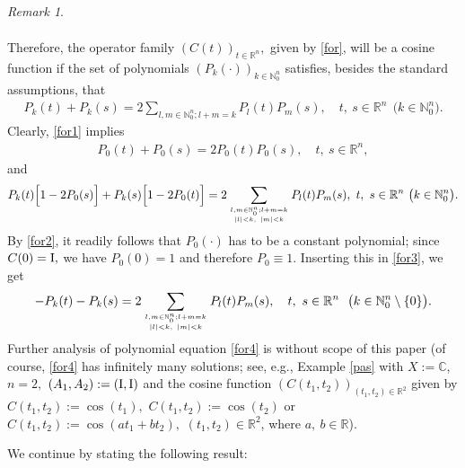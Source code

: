 \documentclass{amsart}
\theoremstyle{definition}
\theoremstyle{remark}
\newtheorem{rem}[thm]{Remark}
\numberwithin{equation}{section}
\begin{document}
\begin{rem}
\begin{itemize}
\begin{align*}
\end{align*}
Therefore, the operator family $(C(t))_{t\in {\mathbb R}^{n}},$ given by \eqref{for}, will be a cosine function if the set of polynomials $(P_{k}(\cdot))_{k\in {\mathbb N}_{0}^{n}}$ satisfies, besides the standard assumptions, that
\begin{align}\label{for1}
P_{k}(t)+P_{k}(s)=2\sum_{l,  m\in {\mathbb N}_{0}^{n}; l+m=k}P_{l}(t) P_{m}(s),\quad t,\ s\in {\mathbb R}^{n}\ \ \bigl(k\in {\mathbb N}_{0}^{n}\bigr).
\end{align} 
Clearly, \eqref{for1} implies 
\begin{align}\label{for2}
P_{0}(t)+P_{0}(s)=2P_{0}(t) P_{0}(s),\quad t,\ s\in {\mathbb R}^{n},
\end{align}
and{\small
\begin{align}\label{for3}
P_{k}(t)\Bigl[1-2P_{0}(s)\Bigr]+P_{k}(s)\Bigl[1-2P_{0}(t)\Bigr]=2\sum_{l,  m\in {\mathbb N}_{0}^{n}; l+m=k \atop |l|<k,\ |m|<k}P_{l}(t) P_{m}(s),\ t,\ s\in {\mathbb R}^{n}\  \bigl(k\in {\mathbb N}_{0}^{n}\bigr).
\end{align}}By \eqref{for2}, it readily follows that $P_{0}(\cdot)$ has to be a constant polynomial; since $C(0)={\rm I},$ we have $P_{0}(0)=1$ and therefore $P_{0}\equiv 1.$ Inserting this in \eqref{for3}, we get
\begin{align}\label{for4}
-P_{k}(t)-P_{k}(s)=2\sum_{l,  m\in {\mathbb N}_{0}^{n}; l+m=k \atop |l|<k,\ |m|<k}P_{l}(t) P_{m}(s),\quad t,\ s\in {\mathbb R}^{n}\ \ \bigl(k\in {\mathbb N}_{0}^{n} \setminus \{0\}\bigr).
\end{align}
Further analysis of polynomial equation \eqref{for4} is without scope of this paper (of course, \eqref{for4} has infinitely many solutions; see, e.g., Example \ref{pas} with $X:={\mathbb C}$, $n=2,$ $(A_{1},A_{2}):=({\rm I}, {\rm I})$ and the cosine function $(C(t_{1},t_{2}))_{(t_{1},t_{2})\in {\mathbb R}^{2}}$ given by $C(t_{1},t_{2}):=\cos (t_{1}),$ $C(t_{1},t_{2}):=\cos (t_{2})$  or $C(t_{1},t_{2}):=\cos (at_{1}+bt_{2}),$ $(t_{1},t_{2})\in {\mathbb R}^{2}$, where $a,\ b\in {\mathbb R}$).
\end{itemize}
\end{rem}

We continue by stating the following result:
\end{document}
